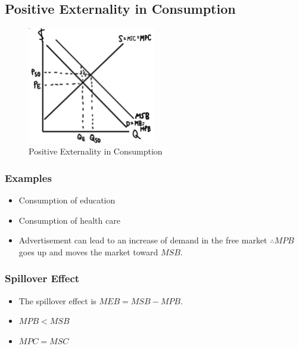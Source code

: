 \documentclass[
  letterpaper,
  DIV=11,
  numbers=noendperiod]{scrartcl}
\providecommand{\tightlist}{%
  \setlength{\itemsep}{0pt}\setlength{\parskip}{0pt}}\usepackage{longtable,booktabs,array}
\begin{document}
\newpage{}

\hypertarget{positive-externality-in-consumption}{%
\subsection{Positive Externality in
Consumption}\label{positive-externality-in-consumption}}

\begin{figure}

{\centering \includegraphics[width=0.5\textwidth,height=\textheight]{img/pos-cons.png}

}

\caption{Positive Externality in Consumption}

\end{figure}

\hypertarget{examples-2}{%
\subsubsection{Examples}\label{examples-2}}

\begin{itemize}
\tightlist
\item
  Consumption of education
\item
  Consumption of health care
\item
  Advertisement can lead to an increase of demand in the free market
  \(\therefore MPB\) goes up and moves the market toward \(MSB\).
\end{itemize}

\hypertarget{spillover-effect}{%
\subsubsection{Spillover Effect}\label{spillover-effect}}

\begin{itemize}
\tightlist
\item
  The spillover effect is \(MEB = MSB-MPB\).
\item
  \(MPB < MSB\)
\item
  \(MPC = MSC\)
\end{itemize}
\end{document}
